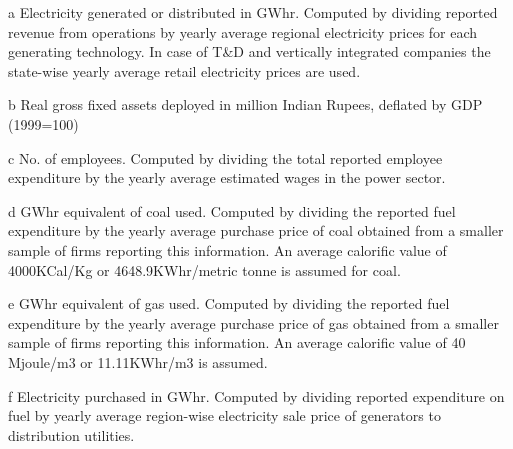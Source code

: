 \begin{table}[htbp]
\begin{adjustwidth}{-1.5cm}{-1cm}
{\begin{threeparttable}
\begin{tablenotes}
       \smallskip 
       \item[a] Electricity generated or distributed in GWhr. Computed by dividing reported revenue from operations by yearly average regional electricity prices for each generating technology. In case of T\&D and vertically integrated companies the state-wise yearly average retail electricity prices are used. 
       \item[b] Real gross fixed assets deployed in million Indian Rupees, deflated by GDP (1999=100)
       \item[c] No. of employees. Computed by dividing the total reported employee expenditure by the yearly average estimated wages in the power sector.
       \item[d] GWhr equivalent of coal used. Computed by dividing the reported fuel expenditure by the yearly average purchase price of coal obtained from a smaller sample of firms reporting this information. An average calorific value of 4000KCal/Kg or 4648.9KWhr/metric tonne is assumed for coal.
       \item[e] GWhr equivalent of gas used. Computed by dividing the reported fuel expenditure by the yearly average purchase price of gas obtained from a smaller sample of firms reporting this information. An average calorific value of 40 Mjoule/m3 or 11.11KWhr/m3 is assumed.
       \item[f] Electricity purchased in GWhr. Computed by dividing reported expenditure on fuel by yearly average region-wise electricity sale price of generators to distribution utilities.       
     \end{tablenotes}
  \end{threeparttable}
    }  
\end{adjustwidth}
\end{table}


